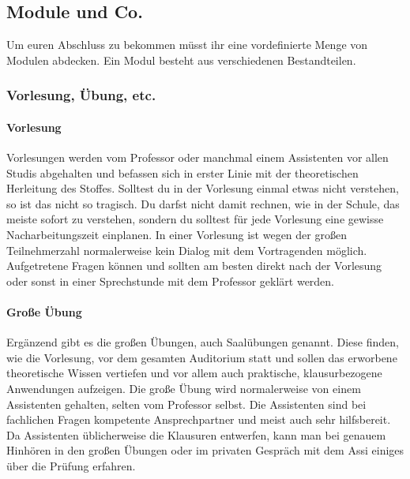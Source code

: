 \begin{multicols}{2}
\subsection{Module und Co.}
	Um euren Abschluss zu bekommen müsst ihr eine vordefinierte Menge von Modulen abdecken. Ein Modul besteht aus verschiedenen Bestandteilen.

\subsubsection{Vorlesung, Übung, etc.}
	\paragraph*{Vorlesung}
	Vorlesungen werden vom Professor oder manchmal einem Assistenten vor allen Studis abgehalten und befassen sich in erster Linie mit der theoretischen Herleitung des Stoffes. Solltest du in der Vorlesung einmal etwas nicht verstehen, so ist das nicht so tragisch. Du darfst nicht damit rechnen, wie in der Schule, das meiste sofort zu verstehen, sondern du solltest für jede Vorlesung eine gewisse Nacharbeitungszeit einplanen. In einer Vorlesung ist wegen der großen Teilnehmerzahl normalerweise kein Dialog mit dem Vortragenden möglich. Aufgetretene Fragen können und sollten am besten direkt nach der Vorlesung oder sonst in einer Sprechstunde mit dem Professor geklärt werden.
	
	\paragraph*{Große Übung}
	Ergänzend gibt es die großen Übungen, auch Saalübungen genannt. Diese finden, wie die Vorlesung, vor dem gesamten Auditorium statt und sollen das erworbene theoretische Wissen vertiefen und vor allem auch praktische, klausurbezogene Anwendungen aufzeigen. Die große Übung wird normalerweise von einem Assistenten gehalten, selten vom Professor selbst. Die Assistenten sind bei fachlichen Fragen kompetente Ansprechpartner und meist auch sehr hilfsbereit. Da Assistenten üblicherweise die Klausuren entwerfen, kann man bei genauem Hinhören in den großen Übungen oder im privaten Gespräch mit dem Assi einiges über die Prüfung erfahren.


\end{multicols}
